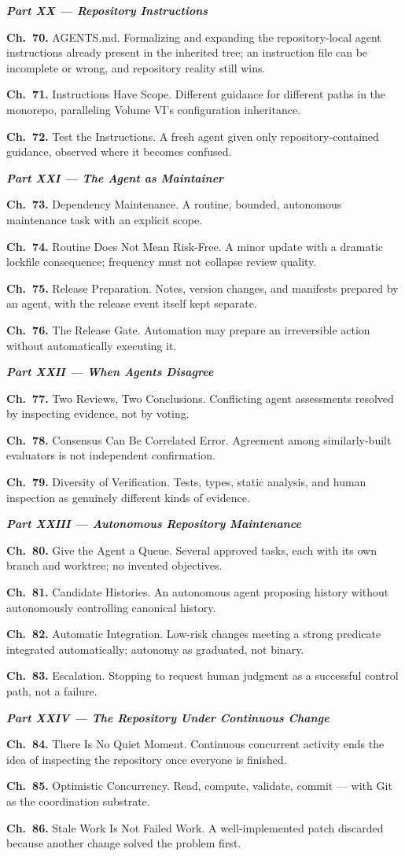 \documentclass[11pt]{book}
\newcommand{\chapentry}[2]{\noindent\textbf{Ch.~#1.} #2\par\smallskip}
\newcommand{\partheading}[1]{\bigskip\noindent\textbf{\textit{#1}}\smallskip\par}
\begin{document}
\partheading{Part XX --- Repository Instructions}
\chapentry{70}{AGENTS.md. Formalizing and expanding the repository-local agent instructions already present in the inherited tree; an instruction file can be incomplete or wrong, and repository reality still wins.}
\chapentry{71}{Instructions Have Scope. Different guidance for different paths in the monorepo, paralleling Volume VI's configuration inheritance.}
\chapentry{72}{Test the Instructions. A fresh agent given only repository-contained guidance, observed where it becomes confused.}

\partheading{Part XXI --- The Agent as Maintainer}
\chapentry{73}{Dependency Maintenance. A routine, bounded, autonomous maintenance task with an explicit scope.}
\chapentry{74}{Routine Does Not Mean Risk-Free. A minor update with a dramatic lockfile consequence; frequency must not collapse review quality.}
\chapentry{75}{Release Preparation. Notes, version changes, and manifests prepared by an agent, with the release event itself kept separate.}
\chapentry{76}{The Release Gate. Automation may prepare an irreversible action without automatically executing it.}

\partheading{Part XXII --- When Agents Disagree}
\chapentry{77}{Two Reviews, Two Conclusions. Conflicting agent assessments resolved by inspecting evidence, not by voting.}
\chapentry{78}{Consensus Can Be Correlated Error. Agreement among similarly-built evaluators is not independent confirmation.}
\chapentry{79}{Diversity of Verification. Tests, types, static analysis, and human inspection as genuinely different kinds of evidence.}

\partheading{Part XXIII --- Autonomous Repository Maintenance}
\chapentry{80}{Give the Agent a Queue. Several approved tasks, each with its own branch and worktree; no invented objectives.}
\chapentry{81}{Candidate Histories. An autonomous agent proposing history without autonomously controlling canonical history.}
\chapentry{82}{Automatic Integration. Low-risk changes meeting a strong predicate integrated automatically; autonomy as graduated, not binary.}
\chapentry{83}{Escalation. Stopping to request human judgment as a successful control path, not a failure.}

\partheading{Part XXIV --- The Repository Under Continuous Change}
\chapentry{84}{There Is No Quiet Moment. Continuous concurrent activity ends the idea of inspecting the repository once everyone is finished.}
\chapentry{85}{Optimistic Concurrency. Read, compute, validate, commit --- with Git as the coordination substrate.}
\chapentry{86}{Stale Work Is Not Failed Work. A well-implemented patch discarded because another change solved the problem first.}
\end{document}
